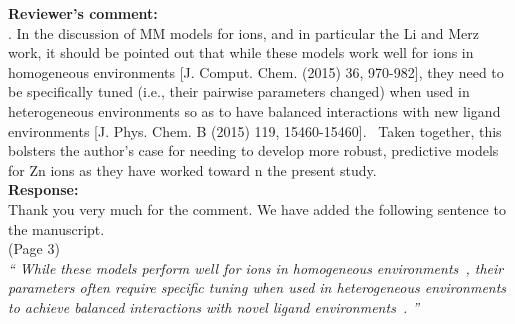 \documentclass[doublespace,prb,aps,preprint]{revtex4}
\newcommand{\Quote}[1]{\textsl{``#1''}}
\newenvironment{Comment}{ {\bf \indent Reviewer's comment: \\} \setlength{\parindent}{1cm}  \sffamily }{ \ignorespacesafterend \\}
\newenvironment{Reply}{  {\bf Response: \\}  \setlength{\parindent}{1cm} \normalfont }{ \ignorespacesafterend \vspace{5mm}}
\newcommand{\HJ}[1]{\textcolor{red}{#1}}
\begin{document}
\begin{Comment}
4. In the discussion of MM models for ions, and in particular the Li and Merz work, 
it should be pointed out that while these models work well for ions in homogeneous environments [J. Comput. Chem. (2015) 36, 970-982], 
they need to be specifically tuned (i.e., their pairwise parameters changed) when used in heterogeneous environments so as to have balanced interactions with new ligand environments [J. Phys. Chem. B (2015) 119, 15460-15460].  
Taken together, this bolsters the author’s case for needing to develop more robust, 
predictive models for Zn ions as they have worked toward n the present study.
\end{Comment}
\begin{Reply}
    Thank you very much for the comment. 
    We have added the following sentence to the manuscript.  \\
    \newline
    (Page 3) \\
    \Quote{
        While these models perform well for ions in homogeneous environments~\cite{panteva2015comparison}, 
        their parameters often require specific tuning when used in heterogeneous environments to achieve balanced interactions with novel ligand environments~\cite{panteva2015force}. 
    } 
\end{Reply}
\end{document}
